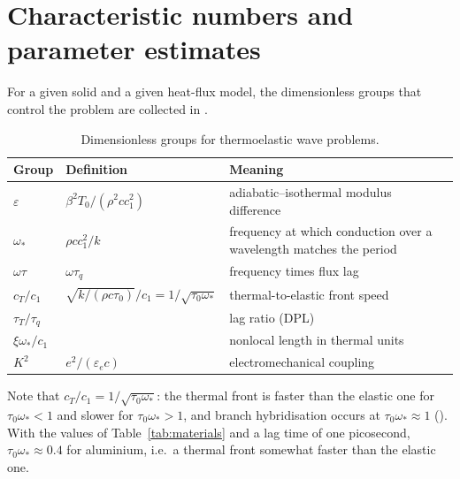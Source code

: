 \section{Characteristic numbers and parameter estimates}\label{app:numbers}
For a given solid and a given heat-flux model, the dimensionless groups that control the problem are collected in .
\begin{table}[ht]\centering\small
\caption{Dimensionless groups for thermoelastic wave problems.}\label{tab:groups}
\begin{tabular}{@{}llp{6.2cm}@{}}\toprule
Group & Definition & Meaning\\\midrule
$\varepsilon$ & $\beta^2T_0/(\rho^2cc_1^2)$ & adiabatic--isothermal modulus difference\\
$\omega_*$ & $\rho cc_1^2/k$ & frequency at which conduction over a wavelength matches the period\\
$\omega\tau$ & $\omega\tau_q$ & frequency times flux lag\\
$c_T/c_1$ & $\sqrt{k/(\rho c\tau_0)}/c_1=1/\sqrt{\tau_0\omega_*}$ & thermal-to-elastic front speed\\
$\tau_T/\tau_q$ & & lag ratio (DPL)\\
$\xi\omega_*/c_1$ & & nonlocal length in thermal units\\
$K^2$ & $e^2/(\varepsilon_ec)$ & electromechanical coupling\\
\bottomrule\end{tabular}
\end{table}
Note that $c_T/c_1=1/\sqrt{\tau_0\omega_*}$: the thermal front is faster than the elastic one for $\tau_0\omega_*<1$ and slower for $\tau_0\omega_*>1$, and branch hybridisation occurs at $\tau_0\omega_*\approx1$ (). With the values of Table~\ref{tab:materials} and a lag time of one picosecond, $\tau_0\omega_*\approx0.4$ for aluminium, i.e.\ a thermal front somewhat faster than the elastic one.

